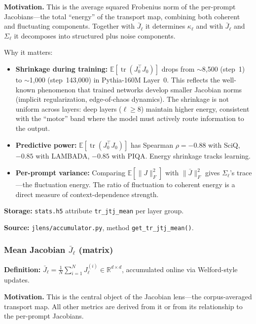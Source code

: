 \documentclass[11pt,a4paper]{article}
\begin{document}
\textbf{Motivation.} This is the average squared Frobenius norm of the per-prompt Jacobians---the total ``energy'' of the transport map, combining both coherent and fluctuating components. Together with $\bar{J}_\ell$ it determines $\kappa_\ell$ and with $\bar{J}_\ell$ and $\Sigma_\ell$ it decomposes into structured plus noise components.

Why it matters:
\begin{itemize}
  \item \textbf{Shrinkage during training:} $\mathbb{E}[\operatorname{tr}(J_0^\top J_0)]$ drops from $\sim$8,500 (step~1) to $\sim$1,000 (step~143,000) in Pythia-160M Layer~0. This reflects the well-known phenomenon that trained networks develop smaller Jacobian norms (implicit regularization, edge-of-chaos dynamics). The shrinkage is not uniform across layers: deep layers ($\ell \geq 8$) maintain higher energy, consistent with the ``motor'' band where the model must actively route information to the output.
  \item \textbf{Predictive power:} $\mathbb{E}[\operatorname{tr}(J_0^\top J_0)]$ has Spearman $\rho = -0.88$ with SciQ, $-0.85$ with LAMBADA, $-0.85$ with PIQA. Energy shrinkage tracks learning.
  \item \textbf{Per-prompt variance:} Comparing $\mathbb{E}[\|J\|_F^2]$ with $\|\bar{J}\|_F^2$ gives $\Sigma_\ell$'s trace---the fluctuation energy. The ratio of fluctuation to coherent energy is a direct measure of context-dependence strength.
\end{itemize}

\textbf{Storage:} \texttt{stats.h5} attribute \texttt{tr\_jtj\_mean} per layer group.

\textbf{Source:} \texttt{jlens/accumulator.py}, method \texttt{get\_tr\_jtj\_mean()}.

\subsubsection{Mean Jacobian $\bar{J}_\ell$ (matrix)}
\label{sec:jbar}

\textbf{Definition:} $\bar{J}_\ell = \frac{1}{N} \sum_{i=1}^N J_\ell^{(i)} \in \mathbb{R}^{d \times d}$, accumulated online via Welford-style updates.

\textbf{Motivation.} This is the central object of the Jacobian lens---the corpus-averaged transport map. All other metrics are derived from it or from its relationship to the per-prompt Jacobians.
\end{document}
